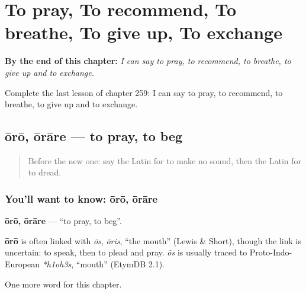 
\chapter{To pray, To recommend, To breathe, To give up, To exchange}
\label{ch:la-to-pray-to-recommend-to-breathe-to-give-up-to-exchange}

\begin{chapteropening}
\textbf{By the end of this chapter:} \emph{I can say to pray, to recommend, to breathe, to give up and to exchange.}

Complete the last lesson of chapter 259: I can say to pray, to recommend, to breathe, to give up and to exchange.
\end{chapteropening}

\section[ōrō, ōrāre]{ōrō, ōrāre — to pray, to beg}

\label{lesson:LA-C259-oro}



\begin{quote}
Before the new one: say the Latin for to make no sound, then the Latin for to dread.
\end{quote}

\subsection*{You'll want to know: ōrō, ōrāre}
\textbf{ōrō, ōrāre} — \textquotedblleft{}to pray, to beg\textquotedblright{}.

\begin{cousinweb}
\textbf{ōrō} is often linked with \emph{ōs}, \emph{ōris}, \textquotedblleft{}the mouth\textquotedblright{} (Lewis \& Short), though the link is uncertain: to speak, then to plead and pray. \emph{ōs} is usually traced to Proto-Indo-European \emph{*h1oh3s}, \textquotedblleft{}mouth\textquotedblright{} (EtymDB 2.1).
\end{cousinweb}

\begin{grammarlens}[title={What you've built}]
One more word for this chapter.
\end{grammarlens}

